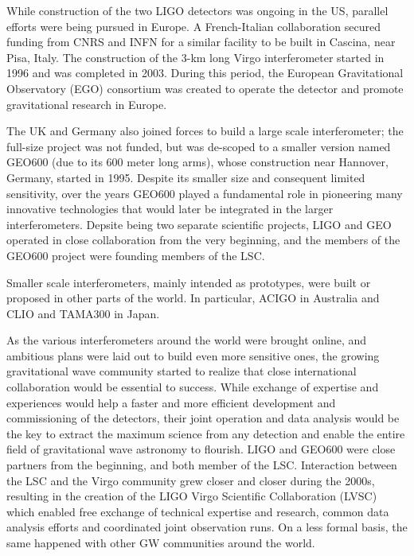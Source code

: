 While construction of the two LIGO detectors was ongoing in the US, parallel efforts 
were being pursued in Europe. A French-Italian collaboration secured funding from CNRS and INFN for a 
similar facility to be built in Cascina, near Pisa, Italy.
The construction of the 3-km long Virgo interferometer started in 1996 and was completed in 2003.
During this period, the European Gravitational Observatory (EGO) consortium was created to operate the detector 
and promote gravitational research in Europe.

The UK and Germany also joined forces to build a large scale interferometer; the full-size project was not funded, but was de-scoped to a smaller version named GEO600 (due to its 600 meter long arms), 
whose construction near Hannover, Germany, started in 1995. Despite its smaller size and consequent limited sensitivity, over the years GEO600 played a fundamental role in pioneering many innovative technologies that would later be integrated in the larger interferometers.
Depsite being two separate scientific projects, LIGO and GEO operated in close collaboration from the very beginning, and the members of the GEO600 project were founding members of the LSC.

Smaller scale interferometers, mainly intended as prototypes, were built or 
proposed in other parts of the world. In particular, ACIGO in Australia and 
CLIO and TAMA300 in Japan. 

As the various interferometers around the world were brought online, and ambitious plans were laid out to build even more sensitive ones, the growing gravitational wave community started to realize that close international collaboration would be essential to success.
While exchange of expertise and experiences would help a faster and more efficient development and commissioning of the detectors, their joint operation and data analysis would be the key to extract the maximum science from any detection and enable the entire field of gravitational wave astronomy to flourish.
LIGO and GEO600 were close partners from the beginning, and both member of the LSC. Interaction between the LSC and the Virgo community grew closer and closer during the 2000s, resulting in the creation of the LIGO Virgo Scientific Collaboration (LVSC) which enabled free exchange of technical expertise and research, common data analysis efforts and coordinated joint observation runs.
On a less formal basis, the same happened with other GW communities around the world.